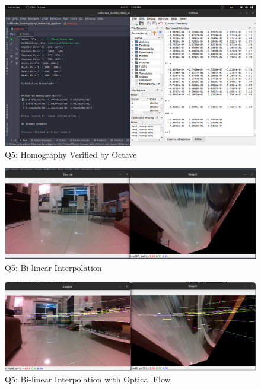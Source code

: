 \documentclass[a4paper,12pt]{article}
\begin{document}
\begin{figure}
	\caption{Q5: Homography Verified by Octave}
	\includegraphics*[scale=0.25]{img/Q5.png}
\end{figure}

\begin{figure}
	\caption{Q5: Bi-linear Interpolation}
	\includegraphics*[scale=0.25]{img/Q5-1.png}
\end{figure}

\begin{figure}
	\caption{Q5: Bi-linear Interpolation with Optical Flow}
	\includegraphics*[scale=0.25]{img/Q5-2.png}
\end{figure}
\end{document}
